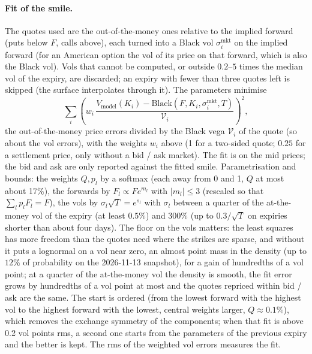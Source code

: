 \paragraph{Fit of the smile.} The quotes used are the out-of-the-money ones relative to the implied forward (puts below
$F$, calls above), each turned into a Black vol $\sigma^{\mathrm{mkt}}_i$ on the implied forward (for an American option the vol of
its price on that forward, which is also the Black vol). Vols that cannot be computed, or outside $0.2$--$5$ times the
median vol of the expiry, are discarded; an expiry with fewer than three quotes left is skipped (the surface
interpolates through it). The parameters minimise
\[
  \sum_i \left(w_i\,\frac{V_{\mathrm{model}}(K_i) - \mathrm{Black}(F, K_i, \sigma^{\mathrm{mkt}}_i, T)}{\mathcal V_i}\right)^2,
\]
the out-of-the-money price errors divided by the Black vega $\mathcal V_i$ of the quote (so about the vol errors), with
the weights $w_i$ above (1 for a two-sided quote; $0.25$ for a settlement price, only without a bid / ask market). The fit is on the mid prices; the bid
and ask are only reported against the fitted smile. Parametrisation and bounds: the weights $Q, p_l$ by a softmax (each
away from 0 and 1, $Q$ at most about 17\%), the forwards by $F_l \propto F e^{m_l}$ with $|m_l| \le 3$ (rescaled so that
$\sum_l p_l F_l = F$), the vols by $\sigma_l\sqrt T = e^{s_l}$ with $\sigma_l$ between a quarter of the at-the-money
vol of the expiry (at least $0.5\%$) and $300\%$ (up to $0.3/\sqrt T$ on expiries shorter than about four days). The
floor on the vols matters: the least squares has more freedom than the quotes need where the strikes are sparse, and
without it puts a lognormal on a vol near zero, an almost point mass in the density (up to $12\%$ of probability on the
2026-11-13 snapshot), for a gain of hundredths of a vol point; at a quarter of the at-the-money vol the density is
smooth, the fit error grows by hundredths of a vol point at most and the quotes repriced within bid / ask are the
same. The start is ordered (from the lowest forward with the highest vol to the
highest forward with the lowest, central weights
larger, $Q \approx 0.1\%$), which removes the exchange symmetry of the components; when that fit is above 0.2 vol
points rms, a second one starts from the parameters of the previous expiry and the better is kept. The rms of the
weighted vol errors measures the fit.

